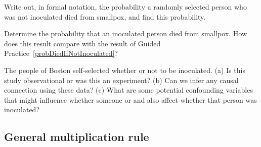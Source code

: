 
\begin{exercisewrap}
\begin{nexercise} \label{probDiedIfNotInoculated}
Write out, in formal notation, the probability a randomly selected person who was not inoculated died from smallpox, and find this \mbox{probability.}\footnotemark
\end{nexercise}
\end{exercisewrap}

\begin{exercisewrap}
\begin{nexercise}
Determine the probability that an inoculated person died from smallpox. How does this result compare with the result of Guided Practice~\ref{probDiedIfNotInoculated}?\footnotemark
\end{nexercise}
\end{exercisewrap}

\begin{exercisewrap}
\begin{nexercise}\label{SmallpoxInoculationObsExpExercise}
The people of Boston self-selected whether or not to be inoculated. (a) Is this study observational or was this an experiment? (b) Can we infer any causal connection using these data? (c) What are some potential confounding variables that might influence whether someone  or  and also affect whether that person was inoculated?\footnotemark
\end{nexercise}
\end{exercisewrap}


\subsection{General multiplication rule}

